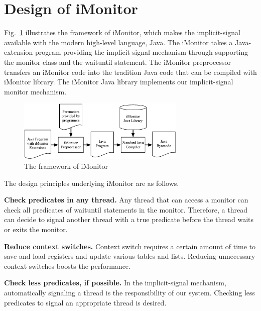 \documentclass[preprint]{sigplanconf}
\begin{document}
\section{Design of iMonitor} \label{sec:fw}
Fig.~\ref{fig:fw} illustrates the framework of iMonitor, which makes 
the implicit-signal available with the modern high-level language, Java. 
The iMonitor takes a Java-extension program providing the implicit-signal 
mechanism through supporting the monitor class and the waituntil statement. The 
iMonitor preprocessor transfers an iMonitor code into the tradition Java code 
that can be compiled with iMonitor library. The iMonitor 
Java library implements our implicit-signal monitor mechanism.  

\begin{figure}[ht!]
  \centering
  \includegraphics[width=80mm]{fig/flow.eps}
  \caption{The framework of iMonitor}
  \label{fig:fw}
\end{figure}




The design principles underlying iMonitor are as follows.

\begin{description}
    \item{\bf Check predicates in any thread.} Any thread that can access a
        monitor can check all predicates of waituntil statements in the 
        monitor. Therefore, a thread can decide
        to signal another thread with a true predicate before the thread waits
        or exits the monitor. 
    \item{\bf Reduce context switches.} Context switch requires a certain 
        amount of time to save and load registers and update various tables and
        lists. Reducing unnecessary context switches boosts the performance. 
    \item {\bf Check less predicates, if possible.} In the implicit-signal
        mechanism, automatically signaling a thread is the responsibility of our
        system. Checking less predicates to signal an appropriate thread is
        desired. 
\end{description}
\end{document}
